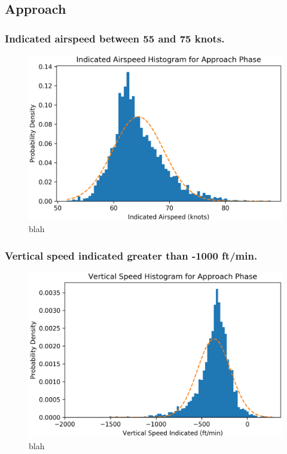     \subsection{Approach}
    
    	
    	\subsubsection{Indicated airspeed between 55 and 75 knots.}
        
            \begin{figure}
                \centering
                \includegraphics[width=\linewidth]{img/ias_hist}
                \caption{blah}
                \label{fig:approach_ias_hist}
            \end{figure}
        
        
    	\subsubsection{Vertical speed indicated greater than -1000 ft/min.}
        
            \begin{figure}
                \centering
                \includegraphics[width=\linewidth]{img/vsi_hist}
                \caption{blah}
                \label{fig:approach_vsi_hist}
            \end{figure}
        
